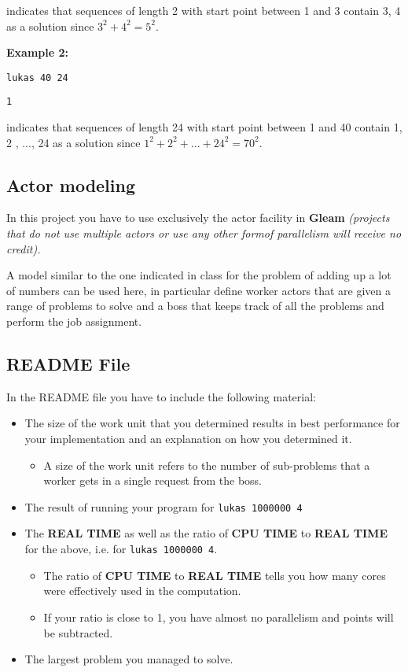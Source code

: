 \documentclass{article}
\begin{document}
\noindent indicates that sequences of length 2 with start point between 1 and 3 contain 3, 4 as a solution since \(3^2 + 4^2 = 5^2\).

\newpage

\noindent\textbf{Example 2:}

\texttt{lukas 40 24}

\texttt{1}

\hspace{1cm}

\noindent indicates that sequences of length 24 with start point between 1 and 40 contain 1, 2 , ..., 24 as a solution since \(1^2 + 2^2 + ... + 24^2 = 70^2\).

\subsection{Actor modeling} In this project you have to use exclusively the actor facility in \textbf{Gleam} \textit{(projects that do not use multiple actors or use any other formof parallelism will receive no credit).} 

A model similar to the one indicated in class for the problem of adding up a lot of numbers can be used here, in particular define worker actors that are given a range of problems to solve and a boss that keeps track of all the problems and perform the job assignment.

\subsection{README File} In the README file you have to include the following material:

\begin{itemize}
    \item The size of the work unit that you determined results in best performance for your implementation and an explanation on how you determined it. 
    \begin{itemize}
        \item A size of the work unit refers to the number of sub-problems that a worker gets in a single request from the boss.
    \end{itemize}

    \item The result of running your program for \texttt{lukas 1000000 4}
    
    \item The \textbf{REAL TIME} as well as the ratio of \textbf{CPU TIME} to \textbf{REAL TIME} for the above, i.e. for \texttt{lukas 1000000 4}.
    \begin{itemize}
        \item The ratio of \textbf{CPU TIME} to \textbf{REAL TIME} tells you how many cores were effectively used in the computation. 
        \item If your ratio is close to 1, you have almost no parallelism and points will be subtracted.
    \end{itemize}
    
    \item The largest problem you managed to solve.
\end{itemize}
\end{document}
